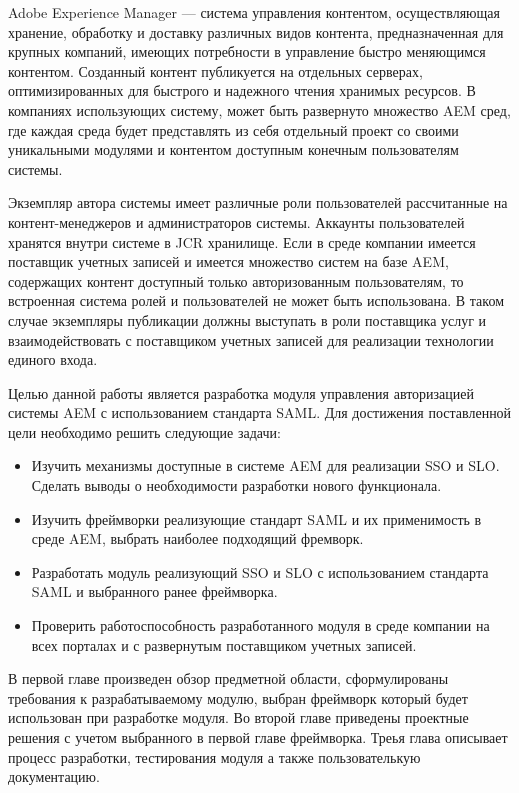 \Introduction

Adobe Experience Manager — система управления контентом, осуществляющая хранение, обработку и доставку различных видов контента, предназначенная для крупных компаний, имеющих потребности в управление быстро меняющимся контентом. Созданный контент публикуется на отдельных серверах, оптимизированных для быстрого и надежного чтения хранимых ресурсов. В компаниях использующих систему, может быть развернуто множество AEM сред, где каждая среда будет представлять из себя отдельный проект со своими уникальными модулями и контентом доступным конечным пользователям системы. 

Экземпляр автора системы имеет различные роли пользователей рассчитанные на контент-менеджеров и администраторов системы. Аккаунты пользователей хранятся внутри системе в JCR хранилище. Если в среде компании имеется поставщик учетных записей и имеется множество систем на базе AEM, содержащих контент доступный только авторизованным пользователям, то встроенная система ролей и пользователей не может быть использована. В таком случае экземпляры публикации должны выступать в роли поставщика услуг и взаимодействовать с поставщиком учетных записей для реализации технологии единого входа.

Целью данной работы является разработка модуля управления авторизацией системы AEM с использованием стандарта SAML. Для достижения поставленной цели необходимо решить следующие задачи:

\begin{itemize}
\item Изучить механизмы доступные в системе AEM для реализации SSO и SLO. Сделать выводы о необходимости разработки нового функционала.
\item Изучить фреймворки реализующие стандарт SAML и их применимость в среде AEM, выбрать наиболее подходящий фремворк.
\item Разработать модуль реализующий SSO и SLO с использованием стандарта SAML и выбранного ранее фреймворка.
\item Проверить работоспособность разработанного модуля в среде компании на всех порталах и с развернутым поставщиком учетных записей.
\end{itemize}

В первой главе произведен обзор предметной области, сформулированы требования к разрабатываемому модулю, выбран фреймворк который будет использован при разработке модуля. Во второй главе приведены проектные решения с учетом выбранного в первой главе фреймворка. Треья глава описывает процесс разработки, тестирования модуля а также пользователькую документацию.